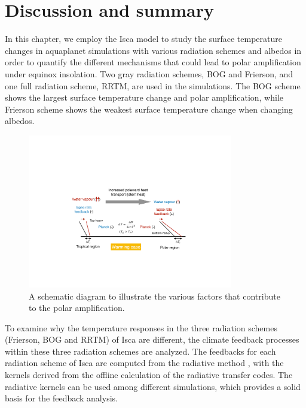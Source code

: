 
\section{Discussion and summary}
\label{sec:polar_amplification_summary}

In this chapter, we employ the Isca model to study the surface temperature changes in aquaplanet simulations with various radiation schemes and albedos in order to quantify the different mechanisms that could lead to polar amplification under equinox insolation. Two gray radiation schemes, BOG and Frierson, and one full radiation scheme, RRTM, are used in the simulations. The BOG scheme shows the largest surface temperature change and polar amplification, while Frierson scheme shows the weakest surface temperature change when changing albedos. %

\begin{figure}[ht]
    \centering
	\includegraphics[width=0.8\textwidth]{figs/polar_amp/pa_dynamic.pdf}
	\caption{A schematic diagram to illustrate the various factors that contribute to the polar amplification.}
	\label{fig:pa_mechanism_schematic}
\end{figure}

To examine why the temperature responses in the three radiation schemes (Frierson, BOG and RRTM) of Isca are different, the climate feedback processes within these three radiation schemes are analyzed. The feedbacks for each radiation scheme of Isca are computed from the radiative method \citep{Soden2008,Shell2008}, with the kernels derived from the offline calculation of the radiative transfer codes. The radiative kernels can be used among different simulations, which provides a solid basis for the feedback analysis.

